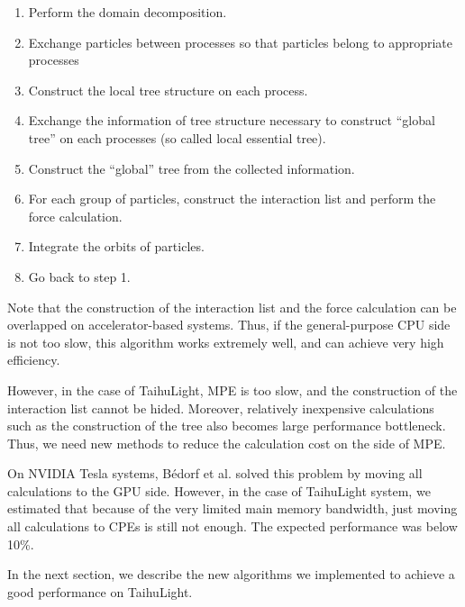 \documentclass[oribibl]{llncs}
\begin{document}
\begin{enumerate}

\item Perform the domain decomposition.
  
\item Exchange particles between processes so that particles belong to
  appropriate processes
  
\item Construct the local tree structure on each process.

\item Exchange the information of tree structure necessary to
  construct ``global tree'' on each processes (so called local
  essential tree).
  
\item Construct the ``global'' tree from the collected information.

\item For each group of particles, construct the interaction list and
  perform the force calculation.
  
\item Integrate the orbits of particles.

\item Go back to step 1.
  
\end{enumerate}

Note that the construction of the interaction list and the force
calculation can be overlapped on accelerator-based systems. Thus, if
the general-purpose CPU side is not too slow, this algorithm works
extremely well, and can achieve very high efficiency.

However, in the case of TaihuLight, MPE is too slow, and the
construction of the interaction list cannot be hided. Moreover,
relatively inexpensive calculations such as the construction of the
tree also becomes large performance bottleneck. Thus, we need new
methods to reduce the calculation cost on the side of MPE.

On NVIDIA Tesla systems, B{\'e}dorf et al. \cite{2014hpcn.conf...54B}
solved this problem by moving all calculations to the GPU side.
However, in the case of TaihuLight system, we estimated that because
of the very limited main memory bandwidth, just moving all
calculations to CPEs is still not enough. The expected performance was
below 10\%.

In the next section, we describe the new algorithms we implemented to
achieve a good performance on TaihuLight.
\end{document}
